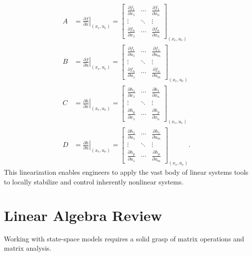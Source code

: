 \begin{align}
    A &= \left. \frac{\partial f}{\partial x} \right|_{(x_e, u_e)} = \begin{bmatrix}
        \frac{\partial f_1}{\partial x_1} & \cdots & \frac{\partial f_1}{\partial x_n} \\
        \vdots & \ddots & \vdots \\
        \frac{\partial f_n}{\partial x_1} & \cdots & \frac{\partial f_n}{\partial x_n}
    \end{bmatrix}_{(x_e, u_e)} \\
    B &= \left. \frac{\partial f}{\partial u} \right|_{(x_e, u_e)} = \begin{bmatrix}
        \frac{\partial f_1}{\partial u_1} & \cdots & \frac{\partial f_1}{\partial u_m} \\
        \vdots & \ddots & \vdots \\
        \frac{\partial f_n}{\partial u_1} & \cdots & \frac{\partial f_n}{\partial u_m}
    \end{bmatrix}_{(x_e, u_e)} \\
    C &= \left. \frac{\partial h}{\partial x} \right|_{(x_e, u_e)} = \begin{bmatrix}
        \frac{\partial h_1}{\partial x_1} & \cdots & \frac{\partial h_1}{\partial x_n} \\
        \vdots & \ddots & \vdots \\
        \frac{\partial h_p}{\partial x_1} & \cdots & \frac{\partial h_p}{\partial x_n}
    \end{bmatrix}_{(x_e, u_e)} \\
    D &= \left. \frac{\partial h}{\partial u} \right|_{(x_e, u_e)} = \begin{bmatrix}
        \frac{\partial h_1}{\partial u_1} & \cdots & \frac{\partial h_1}{\partial u_m} \\
        \vdots & \ddots & \vdots \\
        \frac{\partial h_p}{\partial u_1} & \cdots & \frac{\partial h_p}{\partial u_m}
\end{bmatrix}_{(x_e, u_e)} .
\end{align}
This linearization enables engineers to apply the vast body of linear systems tools to locally stabilize and control inherently nonlinear systems.

\section{Linear Algebra Review}
Working with state-space models requires a solid grasp of matrix operations and matrix analysis.

